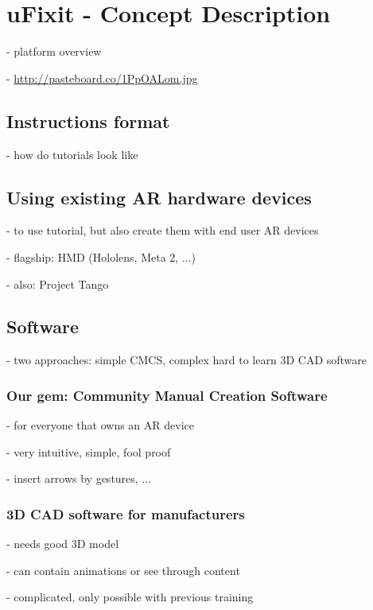
\chapter{uFixit - Concept Description}

	- platform overview
	
	- \url{http://pasteboard.co/1PpOALom.jpg}

	\section{Instructions format}
	
		- how do tutorials look like
	
	\section{Using existing AR hardware devices}
	
		- to use tutorial, but also create them with end user AR devices
	
		- flagship: HMD (Hololens, Meta 2, ...)
		
		- also: Project Tango
	
	\section{Software}
	
		- two approaches: simple CMCS, complex hard to learn 3D CAD software
		
		\subsection{Our gem: Community Manual Creation Software}
		
			- for everyone that owns an AR device
			
			- very intuitive, simple, fool proof
			
			- insert arrows by gestures, ...
	
		\subsection{3D CAD software for manufacturers}
		
			- needs good 3D model
			
			- can contain animations or see through content

			- complicated, only possible with previous training

